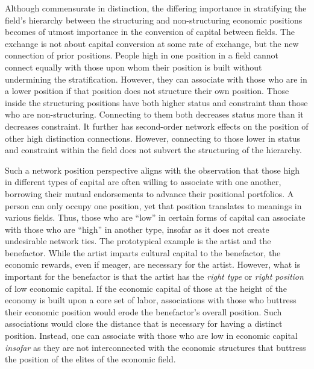 \documentclass[12pt]{article}
\begin{document}
Although commensurate in distinction, the differing importance in stratifying the field's hierarchy between the structuring and non-structuring economic positions becomes of utmost importance in the conversion of capital between fields. The exchange is not about capital conversion at some rate of exchange, but the new connection of prior positions. People high in one position in a field cannot connect equally with those upon whom their position is built without undermining the stratification. However, they can associate with those who are in a lower position if that position does not structure their own position. Those inside the structuring positions have both higher status and constraint than those who are non-structuring. Connecting to them both decreases status more than it decreases constraint. It further has second-order network effects on the position of other high distinction connections. However, connecting to those lower in status and constraint within the field does not subvert the structuring of the hierarchy. 

Such a network position perspective aligns with the observation that those high in different types of capital are often willing to associate with one another, borrowing their mutual endorsements to advance their positional portfolios. A person can only occupy one position, yet that position translates to meanings in various fields. Thus, those who are ``low'' in certain forms of capital can associate with those who are ``high'' in another type, insofar as it does not create undesirable network ties. The prototypical example is the artist and the benefactor. While the artist imparts cultural capital to the benefactor, the economic rewards, even if meager, are necessary for the artist. However, what is important for the benefactor is that the artist has the \textit{right type} or \textit{right position} of low economic capital. If the economic capital of those at the height of the economy is built upon a core set of labor, associations with those who buttress their economic position would erode the benefactor's overall position. Such associations would close the distance that is necessary for having a distinct position. Instead, one can associate with those who are low in economic capital \textit{insofar} as they are not interconnected with the economic structures that buttress the position of the elites of the economic field. 
\end{document}
